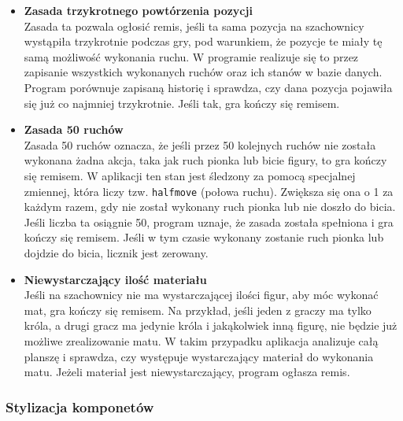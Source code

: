 \documentclass[twoside]{projektInzynierskiMS1}
\begin{document}
\begin{itemize}
    \item \textbf{Zasada trzykrotnego powtórzenia pozycji}\\
    Zasada ta pozwala ogłosić remis, jeśli ta sama pozycja na szachownicy wystąpiła trzykrotnie podczas gry, pod warunkiem, że pozycje te miały tę samą możliwość wykonania ruchu. W programie realizuje się to przez zapisanie wszystkich wykonanych ruchów oraz ich stanów w bazie danych. Program porównuje zapisaną historię i sprawdza, czy dana pozycja pojawiła się już co najmniej trzykrotnie. Jeśli tak, gra kończy się remisem.

    \item \textbf{Zasada 50 ruchów}\\
    Zasada 50 ruchów oznacza, że jeśli przez 50 kolejnych ruchów nie została wykonana żadna akcja, taka jak ruch pionka lub bicie figury, to gra kończy się remisem. W aplikacji ten stan jest śledzony za pomocą specjalnej zmiennej, która liczy tzw. \texttt{halfmove} (połowa ruchu). Zwiększa się ona o 1 za każdym razem, gdy nie został wykonany ruch pionka lub nie doszło do bicia. Jeśli liczba ta osiągnie 50, program uznaje, że zasada została spełniona i gra kończy się remisem. Jeśli w tym czasie wykonany zostanie ruch pionka lub dojdzie do bicia, licznik jest zerowany.

    \item \textbf{Niewystarczający ilość materiału}\\
    Jeśli na szachownicy nie ma wystarczającej ilości figur, aby móc wykonać mat, gra kończy się remisem. Na przykład, jeśli jeden z graczy ma tylko króla, a drugi gracz ma jedynie króla i jakąkolwiek inną figurę, nie będzie już możliwe zrealizowanie matu. W takim przypadku aplikacja analizuje całą planszę i sprawdza, czy występuje wystarczający materiał do wykonania matu. Jeżeli materiał jest niewystarczający, program ogłasza remis.

\end{itemize}

\newpage

\subsubsection{Stylizacja komponetów}
\end{document}
